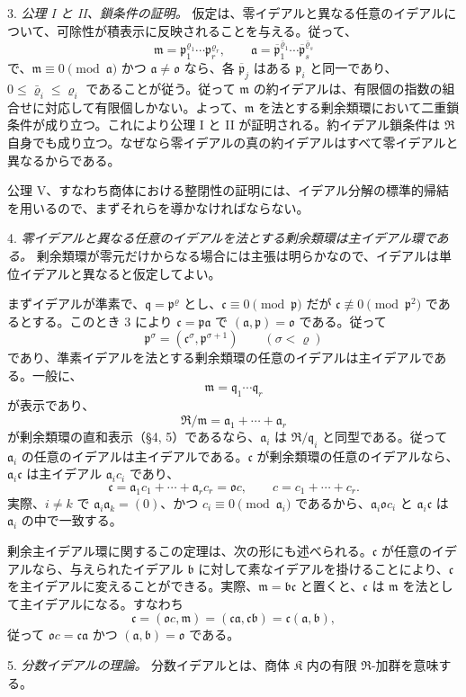 \documentclass[11pt]{article}
\providecommand{\mR}{\mathfrak{R}}
\providecommand{\mK}{\mathfrak{K}}
\providecommand{\mbar}[1]{\overline{#1}}
\providecommand{\ma}{\mathfrak{a}}
\providecommand{\mb}{\mathfrak{b}}
\providecommand{\mc}{\mathfrak{c}}
\providecommand{\mm}{\mathfrak{m}}
\providecommand{\mo}{\mathfrak{o}}
\providecommand{\mpideal}{\mathfrak{p}}
\providecommand{\mq}{\mathfrak{q}}
\begin{document}
3. \emph{公理 I と II、鎖条件の証明。} 仮定は、零イデアルと異なる任意のイデアルについて、可除性が積表示に反映されることを与える。従って、
\[
        \mm=\mpideal_1^{\varrho_1}\cdots\mpideal_r^{\varrho_r},
        \qquad
        \ma=\mbar\mpideal_1^{\bar\varrho_1}\cdots\mbar\mpideal_s^{\bar\varrho_s}
\]
で、$\mm\equiv0\pmod{\ma}$ かつ $\ma\ne\mo$ なら、各 $\mbar\mpideal_j$ はある $\mpideal_i$ と同一であり、$0\le\bar\varrho_i\le\varrho_i$ であることが従う。従って $\mm$ の約イデアルは、有限個の指数の組合せに対応して有限個しかない。よって、$\mm$ を法とする剰余類環において二重鎖条件が成り立つ。これにより公理 I と II が証明される。約イデアル鎖条件は $\mR$ 自身でも成り立つ。なぜなら零イデアルの真の約イデアルはすべて零イデアルと異なるからである。

公理 V、すなわち商体における整閉性の証明には、イデアル分解の標準的帰結を用いるので、まずそれらを導かなければならない。

4. \emph{零イデアルと異なる任意のイデアルを法とする剰余類環は主イデアル環である。} 剰余類環が零元だけからなる場合には主張は明らかなので、イデアルは単位イデアルと異なると仮定してよい。

まずイデアルが準素で、$\mq=\mpideal^\varrho$ とし、$\mc\equiv0\pmod{\mpideal}$ だが $\mc\not\equiv0\pmod{\mpideal^2}$ であるとする。このとき 3 により $\mc=\mpideal\ma$ で $(\ma,\mpideal)=\mo$ である。従って
\[
        \mpideal^\sigma=(\mc^\sigma,\mpideal^{\sigma+1})
        \qquad(\sigma<\varrho)
\]
であり、準素イデアルを法とする剰余類環の任意のイデアルは主イデアルである。一般に、
\[
        \mm=\mq_1\cdots\mq_r
\]
が表示であり、
\[
        \mR/\mm=\ma_1+\cdots+\ma_r
\]
が剰余類環の直和表示（§4, 5）であるなら、$\ma_i$ は $\mR/\mq_i$ と同型である。従って $\ma_i$ の任意のイデアルは主イデアルである。$\mc$ が剰余類環の任意のイデアルなら、$\ma_i\mc$ は主イデアル $\ma_i c_i$ であり、
\[
        \mc=\ma_1c_1+\cdots+\ma_r c_r=\mo c,
        \qquad c=c_1+\cdots+c_r.
\]
実際、$i\ne k$ で $\ma_i\ma_k=(0)$、かつ $c_i\equiv0\pmod{\ma_i}$ であるから、$\ma_i\mo c_i$ と $\ma_i\mc$ は $\ma_i$ の中で一致する。

剰余主イデアル環に関するこの定理は、次の形にも述べられる。$\mc$ が任意のイデアルなら、与えられたイデアル $\mb$ に対して素なイデアルを掛けることにより、$\mc$ を主イデアルに変えることができる。実際、$\mm=\mb\mc$ と置くと、$\mc$ は $\mm$ を法として主イデアルになる。すなわち
\[
        \mc=(\mo c,\mm)=(\mc\ma,\mc\mb)=\mc(\ma,\mb),
\]
従って $\mo c=\mc\ma$ かつ $(\ma,\mb)=\mo$ である。

5. \emph{分数イデアルの理論。} 分数イデアルとは、商体 $\mK$ 内の有限 $\mR$-加群を意味する。
\end{document}
